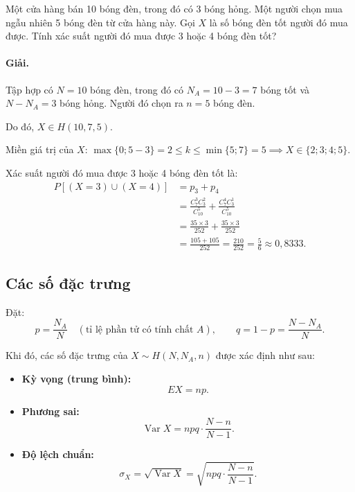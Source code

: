 \begin{vidu}[VD 2]
Một cửa hàng bán 10 bóng đèn, trong đó có 3 bóng hỏng. Một người chọn mua ngẫu nhiên 5 bóng đèn từ cửa hàng này. Gọi $X$ là số bóng đèn tốt người đó mua được. Tính xác suất người đó mua được 3 hoặc 4 bóng đèn tốt?

\paragraph{Giải.}
Tập hợp có $N = 10$ bóng đèn, trong đó có $N_A = 10 - 3 = 7$ bóng tốt và $N - N_A = 3$ bóng hỏng. Người đó chọn ra $n = 5$ bóng đèn.

Do đó, $X \in H(10, 7, 5)$.

Miền giá trị của $X$: $\max\{0; 5 - 3\} = 2 \le k \le \min\{5; 7\} = 5 \implies X \in \{2; 3; 4; 5\}$.

Xác suất người đó mua được 3 hoặc 4 bóng đèn tốt là:
\begin{align*}
P[(X = 3) \cup (X = 4)] &= p_3 + p_4 \\
&= \frac{C_7^3 C_3^2}{C_{10}^5} + \frac{C_7^4 C_3^1}{C_{10}^5} \\
&= \frac{35 \times 3}{252} + \frac{35 \times 3}{252} \\
&= \frac{105 + 105}{252} = \frac{210}{252} = \frac{5}{6} \approx 0{,}8333.
\end{align*}
\end{vidu}

\subsection{Các số đặc trưng}

Đặt:
\[
p = \frac{N_A}{N} \quad (\text{tỉ lệ phần tử có tính chất } A), \qquad q = 1 - p = \frac{N - N_A}{N}.
\]

Khi đó, các số đặc trưng của $X \sim H(N, N_A, n)$ được xác định như sau:
\begin{tinhchat}
\begin{itemize}
    \item \textbf{Kỳ vọng (trung bình):}
    \[
    EX = np.
    \]
    \item \textbf{Phương sai:}
    \[
    \operatorname{Var} X = npq \cdot \frac{N - n}{N - 1}.
    \]
    \item \textbf{Độ lệch chuẩn:}
    \[
    \sigma_X = \sqrt{\operatorname{Var} X} = \sqrt{npq \cdot \frac{N - n}{N - 1}}.
    \]
\end{itemize}
\end{tinhchat}

